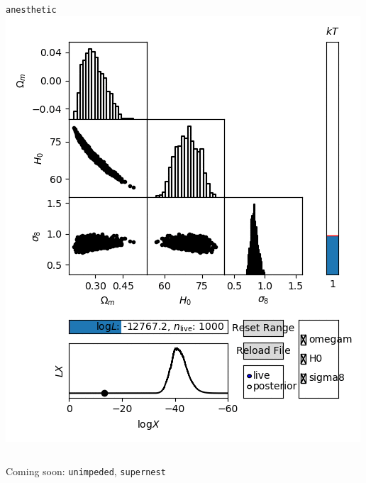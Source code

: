 \documentclass[aspectratio=169]{beamer}
\begin{document}
\begin{frame}
\begin{columns}[t]
        \begin{block}{\texttt{anesthetic}}
            \includegraphics[width=\textwidth]{figures/anim_1-10.png}
        \end{block}
    \end{columns}



    \hfill Coming soon: \texttt{unimpeded}, \texttt{supernest}
\end{frame}
\end{document}
